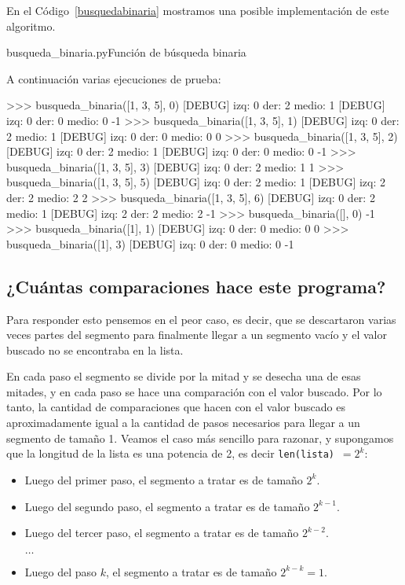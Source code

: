 En el Código~\ref{busquedabinaria} mostramos una posible implementación de
este algoritmo.

\begin{codigo}{busqueda\_binaria.py}{Función de búsqueda binaria}
\label{busquedabinaria}

\end{codigo}

A continuación varias ejecuciones de prueba:

\begin{codigo-python-sn}
>>> busqueda_binaria([1, 3, 5], 0)
[DEBUG] izq: 0 der: 2 medio: 1
[DEBUG] izq: 0 der: 0 medio: 0
-1
>>> busqueda_binaria([1, 3, 5], 1)
[DEBUG] izq: 0 der: 2 medio: 1
[DEBUG] izq: 0 der: 0 medio: 0
0
>>> busqueda_binaria([1, 3, 5], 2)
[DEBUG] izq: 0 der: 2 medio: 1
[DEBUG] izq: 0 der: 0 medio: 0
-1
>>> busqueda_binaria([1, 3, 5], 3)
[DEBUG] izq: 0 der: 2 medio: 1
1
>>> busqueda_binaria([1, 3, 5], 5)
[DEBUG] izq: 0 der: 2 medio: 1
[DEBUG] izq: 2 der: 2 medio: 2
2
>>> busqueda_binaria([1, 3, 5], 6)
[DEBUG] izq: 0 der: 2 medio: 1
[DEBUG] izq: 2 der: 2 medio: 2
-1
>>> busqueda_binaria([], 0)
-1
>>> busqueda_binaria([1], 1)
[DEBUG] izq: 0 der: 0 medio: 0
0
>>> busqueda_binaria([1], 3)
[DEBUG] izq: 0 der: 0 medio: 0
-1
\end{codigo-python-sn}


\subsection*{¿Cuántas comparaciones hace este programa?}

Para responder esto pensemos en el peor caso, es decir, que se descartaron
varias veces partes del segmento para finalmente llegar a un segmento vacío y
el valor buscado no se encontraba en la lista.

En cada paso el segmento se divide por la mitad y se desecha una de esas
mitades, y en cada paso se hace una comparación con el valor buscado. Por lo
tanto, la cantidad de comparaciones que hacen con el valor buscado es
aproximadamente igual a la cantidad de pasos necesarios para llegar a un
segmento de tamaño 1.
Veamos el caso más sencillo para razonar, y supongamos que la longitud de la
lista es una potencia de 2, es decir \lstinline+len(lista)+~$= 2^k$:

\begin{itemize}
\item Luego del primer paso, el segmento a tratar es de tamaño $2^k$.
\item Luego del segundo paso, el segmento a tratar es de tamaño $2^{k-1}$.
\item Luego del tercer paso, el segmento a tratar es de tamaño $2^{k-2}$.

$\ldots$

\item Luego del paso $k$, el segmento a tratar es de tamaño $2^{k-k}=1$.
\end{itemize}


